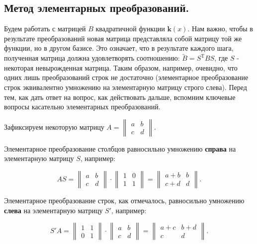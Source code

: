 \subsection{Метод элементарных преобразований.}

Будем работать с матрицей $B$ квадратичной функции $\textbf{k}(x)$. Нам важно, чтобы в результате преобразований новая матрица представляла собой матрицу той же функции, но в другом базисе. Это означает, что в результате каждого шага, полученная матрица должна удовлетворять соотношению: $\widetilde B=S^{\text{T}}BS$, где $S$ - некоторая невырожденная матрица. Таким образом, например, очевидно, что одних лишь преобразований строк не достаточно (элементарное преобразование строк эквивалентно умножению на элементарную матрицу строго слева). Перед тем, как дать ответ на вопрос, как действовать дальше, вспомним ключевые вопросы касательно элементарных преобразований.

Зафиксируем некоторую матрицу $A=\begin{Vmatrix}
a & b  \\
c & d 
\end{Vmatrix}.$ 


Элементарное преобразование столбцов равносильно умножению \textbf{справа} на элементарную матрицу $S$, например:

$$AS=\begin{Vmatrix}
a & b  \\
c & d 
\end{Vmatrix} \cdot \begin{Vmatrix}
1 & 0  \\
1 & 1 
\end{Vmatrix}=\begin{Vmatrix}
a+b & b  \\
c+d & d 
\end{Vmatrix}.$$

Элементарное преобразование строк, как отмечалось, равносильно умножению \textbf{слева} на элементарную матрицу $S'$, например:

$$S'A=\begin{Vmatrix}
1 & 1  \\
0 & 1 
\end{Vmatrix} \cdot \begin{Vmatrix}
a & b  \\
c & d 
\end{Vmatrix}=\begin{Vmatrix}
a+c & b+d  \\
c & d 
\end{Vmatrix}.$$

